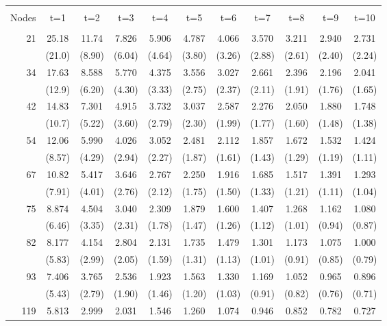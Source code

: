 \begin{table}[!h]
\centering
\begin{tabular}{r|cccccccccc}
\hline&&&&&&&&&&\\[-8pt] Nodes & t=1 & t=2 & t=3 & t=4 & t=5 & t=6
& t=7 & t=8 & t=9 & t=10\\[2pt] \hline&&&&&&&&&&\\[-8pt]
  21 & 25.18 & 11.74 & 7.826 & 5.906 & 4.787 & 4.066 & 3.570 & 3.211 & 2.940 & 2.731\\[-2pt]
     & (21.0) & (8.90) & (6.04) & (4.64) & (3.80) & (3.26) & (2.88) & (2.61) & (2.40) & (2.24)\\[2pt]
  34 & 17.63 & 8.588 & 5.770 & 4.375 & 3.556 & 3.027 & 2.661 & 2.396 & 2.196 & 2.041\\[-2pt]
     & (12.9) & (6.20) & (4.30) & (3.33) & (2.75) & (2.37) & (2.11) & (1.91) & (1.76) & (1.65)\\[2pt]
  42 & 14.83 & 7.301 & 4.915 & 3.732 & 3.037 & 2.587 & 2.276 & 2.050 & 1.880 & 1.748\\[-2pt]
     & (10.7) & (5.22) & (3.60) & (2.79) & (2.30) & (1.99) & (1.77) & (1.60) & (1.48) & (1.38)\\[2pt]
  54 & 12.06 & 5.990 & 4.026 & 3.052 & 2.481 & 2.112 & 1.857 & 1.672 & 1.532 & 1.424\\[-2pt]
     & (8.57) & (4.29) & (2.94) & (2.27) & (1.87) & (1.61) & (1.43) & (1.29) & (1.19) & (1.11)\\[2pt]
  67 & 10.82 & 5.417 & 3.646 & 2.767 & 2.250 & 1.916 & 1.685 & 1.517 & 1.391 & 1.293\\[-2pt]
     & (7.91) & (4.01) & (2.76) & (2.12) & (1.75) & (1.50) & (1.33) & (1.21) & (1.11) & (1.04)\\[2pt]
  75 & 8.874 & 4.504 & 3.040 & 2.309 & 1.879 & 1.600 & 1.407 & 1.268 & 1.162 & 1.080\\[-2pt]
     & (6.46) & (3.35) & (2.31) & (1.78) & (1.47) & (1.26) & (1.12) & (1.01) & (0.94) & (0.87)\\[2pt]
  82 & 8.177 & 4.154 & 2.804 & 2.131 & 1.735 & 1.479 & 1.301 & 1.173 & 1.075 & 1.000\\[-2pt]
     & (5.83) & (2.99) & (2.05) & (1.59) & (1.31) & (1.13) & (1.01) & (0.91) & (0.85) & (0.79)\\[2pt]
  93 & 7.406 & 3.765 & 2.536 & 1.923 & 1.563 & 1.330 & 1.169 & 1.052 & 0.965 & 0.896\\[-2pt]
     & (5.43) & (2.79) & (1.90) & (1.46) & (1.20) & (1.03) & (0.91) & (0.82) & (0.76) & (0.71)\\[2pt]
 119 & 5.813 & 2.999 & 2.031 & 1.546 & 1.260 & 1.074 & 0.946 & 0.852 & 0.782 & 0.727\\[-2pt]

\end{tabular}
\end{table}
